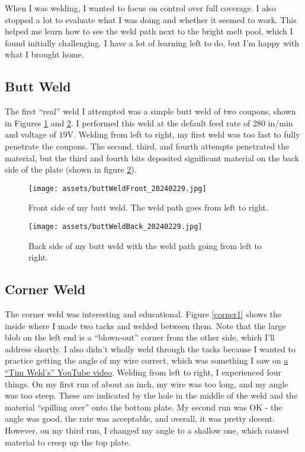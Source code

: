 \documentclass{article}
\begin{document}
When I was welding, I wanted to focus on control over full coverage. I also stopped a lot to evaluate what I was doing and whether it seemed to work. This helped me learn how to see the weld path next to the bright melt pool, which I found initially challenging. I have a lot of learning left to do, but I'm happy with what I brought home.

\subsection*{Butt Weld}

The first ``real'' weld I attempted was a simple butt weld of two coupons, shown in Figures \ref{butt1} and \ref{butt2}. I performed this weld at the default feed rate of 280 in/min and voltage of 19V. Welding from left to right, my first weld was too fast to fully penetrate the coupons. The second, third, and fourth attempts penetrated the material, but the third and fourth bits deposited significant material on the back side of the plate (shown in figure \ref{butt2}).

\begin{figure}[h]
\caption{Front side of my butt weld. The weld path goes from left to right.}
\texttt{[image: assets/buttWeldFront\_20240229.jpg]}
\label{butt1}
\end{figure}

\begin{figure}[h]
\caption{Back side of my butt weld with the weld path going from left to right.}
\texttt{[image: assets/buttWeldBack\_20240229.jpg]}
\label{butt2}
\end{figure}

\subsection*{Corner Weld}

The corner weld was interesting and educational. Figure \ref{corner1} shows the inside where I made two tacks and welded between them. Note that the large blob on the left end is a ``blown-out'' corner from the other side, which I'll address shortly. I also didn't wholly weld through the tacks because I wanted to practice getting the angle of my wire correct, which was something I saw on \href{https://www.youtube.com/watch?v=kUDrP2_JJ68}{a ``Tim Weld's'' YouTube video}. Welding from left to right, I experienced four things. On my first run of about an inch, my wire was too long, and my angle was too steep. These are indicated by the hole in the middle of the weld and the material ``spilling over'' onto the bottom plate. My second run was OK - the angle was good, the rate was acceptable, and overall, it was pretty decent. However, on my third run, I changed my angle to a shallow one, which caused material to creep up the top plate.
\end{document}
